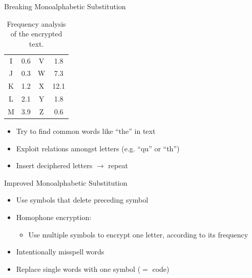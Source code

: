\documentclass[]{beamer}
\begin{document}
\begin{frame}{Breaking Monoalphabetic Substitution}
\begin{minipage}[t]{0.45\textwidth}
{\begin{table}
{\begin{tabular}{c c c c}
						I & 0.6 & V & 1.8\\
						J & 0.3 & W & 7.3\\
						K & 1.2 & X & 12.1\\
						L & 2.1 & Y & 1.8\\
						M & 3.9 & Z & 0.6\\
						\hline
					\end{tabular}
				}
				\caption{Frequency analysis of the encrypted text.}
		\end{table}}
	\end{minipage}
	\vspace{-0.4cm}
	\begin{itemize}
		\item<3-> Try to find common words like ``the'' in text
		\item<4-> Exploit relations amongst letters (e.g. ``qu'' or ``th'')
		\item<5-> Insert deciphered letters \(\rightarrow\) repeat
	\end{itemize}
\end{frame}

\begin{frame}{Improved Monoalphabetic Substitution}
	\begin{itemize}
		\item<1-> Use symbols that delete preceding symbol
		\item<2-> Homophone encryption:
		\begin{itemize}
			\item<2-> Use multiple symbols to encrypt one letter, according to its frequency
		\end{itemize}
		\item<3-> Intentionally misspell words
		\item<4-> Replace single words with one symbol ($=$ code)
	\end{itemize}
\end{frame}
\end{document}
